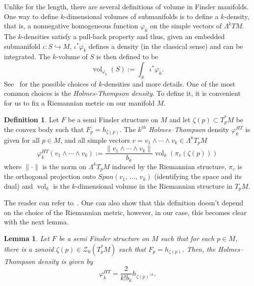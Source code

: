 \documentclass[10pt]{amsart}
\newtheorem{lemm}[theo]{Lemma}\newtheorem{prop}[theo]{Proposition}\newtheorem{coro}[theo]{Corollary}\newtheorem{conj}[theo]{Conjecture}
\theoremstyle{definition}\newtheorem{defi}[theo]{Definition}\newtheorem{rema}[theo]{Remark}\newtheorem{exam}[theo]{Example}\newtheorem{exem}[theo]{Example}\newtheorem{nota}[theo]{Notation}
\newcommand{\ZZo}{\mathscr{Z}_0}
\DeclareMathOperator{\vol}{vol}
\newcommand{\uball}{b}
\begin{document}
Unlike for the length, there are several definitions of volume in Finsler manifolds. One way to define $k$-dimensional volumes of submanifolds is to define a $k$-density, that is, a nonnegative homogeneous function $\varphi_k$ on the simple vectors of $\Lambda^k TM$. The $k$-densities satisfy a pull-back property and thus, given an embedded submanifold $\iota:S\hookrightarrow M $, $\iota^*\varphi_k$ defines a density (in the classical sense) and can be integrated. The $k$-volume of $S$ is then defined to be
\begin{equation*}
\vol_{\varphi_k}(S):=\int_S \iota^*\varphi_k.
\end{equation*}
See~\cite{volumesFinsler}
for the possible choices of $k$-densities and more details. One of the most common choices is the \emph{Holmes-Thompson density}. To define it, it is convenient for us to fix a Riemannian metric on our manifold $M$.

\begin{defi}
Let $F$ be a semi Finsler structure on $M$ and let $\zeta(p)\subset T^*_pM$ be the convex body such that $F_p=h_{\zeta(p)}.$ The $k^{th}$ \emph{Holmes--Thompson} density $\varphi_k^{HT}$ is given for all $p\in M$, and all simple vectors $v=v_1\wedge \cdots\wedge v_k\in\Lambda^k T_pM$
\begin{equation*}
\varphi_k^{HT}(v_1\wedge\cdots\wedge v_k):=\frac{\|v_1\wedge\cdots\wedge v_k\|}{b_k} \vol_k(\pi_v(\zeta(p)))
\end{equation*}
where $\|\cdot\|$ is the norm on $\Lambda^kT_pM$ induced by the Riemannian structure, $\pi_v$ is the orthogonal projection onto $Span(v_1,\,\ldots,\,v_k)$ (identifying the space and its dual) and $\vol_k$ is the $k$-dimensional volume in the Riemannian structure in $T_pM$.
\end{defi}

The reader can refer to~\cite[p.~19]{volumesFinsler}. One can also show that this definition doesn't depend on the choice of the Riemannian metric, however, in our case, this becomes clear with the next lemma.

\begin{lemm}\label{lem:HTandwedge}
Let $F$ be a semi Finsler structure on $M$ such that for each $p\in M$, there is a zonoid $\zeta(p)\in \ZZo(T^*_pM)$ such that $F_p=h_{\zeta(p)}$. Then, the Holmes--Thompson density is given by
\begin{equation*}
\varphi_k^{HT}=\frac{2}{k!\uball_k}h_{\zeta(p)^{\wedge k}}.
\end{equation*}
\end{lemm}
\end{document}
